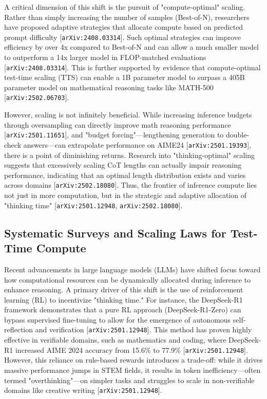 \documentclass[11pt]{article}
\begin{document}
A critical dimension of this shift is the pursuit of "compute-optimal" scaling. Rather than simply increasing the number of samples (Best-of-N), researchers have proposed adaptive strategies that allocate compute based on predicted prompt difficulty [\texttt{arXiv:2408.03314}]. Such optimal strategies can improve efficiency by over 4x compared to Best-of-N and can allow a much smaller model to outperform a 14x larger model in FLOP-matched evaluations [\texttt{arXiv:2408.03314}]. This is further supported by evidence that compute-optimal test-time scaling (TTS) can enable a 1B parameter model to surpass a 405B parameter model on mathematical reasoning tasks like MATH-500 [\texttt{arXiv:2502.06703}].

However, scaling is not infinitely beneficial. While increasing inference budgets through oversampling can directly improve math reasoning performance [\texttt{arXiv:2501.11651}], and "budget forcing"—lengthening generation to double-check answers—can extrapolate performance on AIME24 [\texttt{arXiv:2501.19393}], there is a point of diminishing returns. Research into "thinking-optimal" scaling suggests that excessively scaling CoT lengths can actually impair reasoning performance, indicating that an optimal length distribution exists and varies across domains [\texttt{arXiv:2502.18080}]. Thus, the frontier of inference compute lies not just in more computation, but in the strategic and adaptive allocation of "thinking time" [\texttt{arXiv:2501.12948}, \texttt{arXiv:2502.18080}].

\subsection{Systematic Surveys and Scaling Laws for Test-Time Compute}

Recent advancements in large language models (LLMs) have shifted focus toward how computational resources can be dynamically allocated during inference to enhance reasoning. A primary driver of this shift is the use of reinforcement learning (RL) to incentivize "thinking time." For instance, the DeepSeek-R1 framework demonstrates that a pure RL approach (DeepSeek-R1-Zero) can bypass supervised fine-tuning to allow for the emergence of autonomous self-reflection and verification [\texttt{arXiv:2501.12948}]. This method has proven highly effective in verifiable domains, such as mathematics and coding, where DeepSeek-R1 increased AIME 2024 accuracy from 15.6\% to 77.9\% [\texttt{arXiv:2501.12948}]. However, this reliance on rule-based rewards introduces a trade-off: while it drives massive performance jumps in STEM fields, it results in token inefficiency—often termed "overthinking"—on simpler tasks and struggles to scale in non-verifiable domains like creative writing [\texttt{arXiv:2501.12948}].
\end{document}
